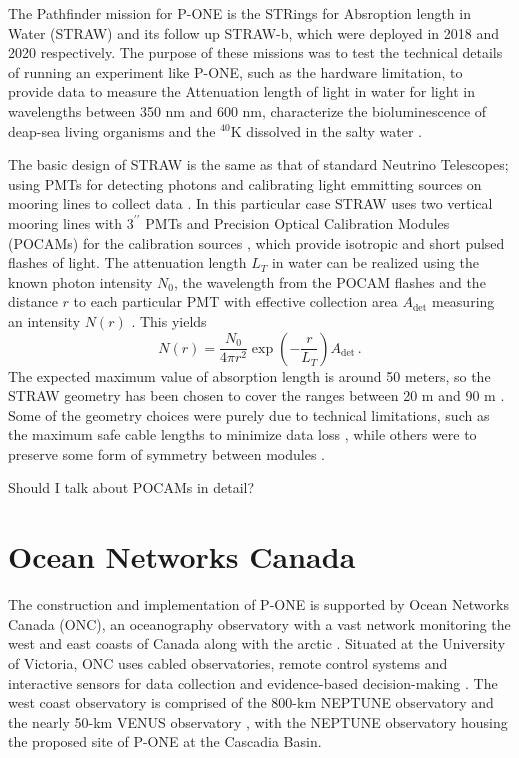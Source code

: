 The Pathfinder mission for P-ONE is the STRings for Absroption length in Water (STRAW) and its follow up STRAW-b, which were deployed in 2018 and 2020 respectively. The purpose of these missions was to test the technical details of running an experiment like P-ONE, such as the hardware limitation, to provide data to measure the Attenuation length of light in water for light in wavelengths between 350 nm and 600 nm, characterize the bioluminescence of deap-sea living organisms and the $^{40}$K dissolved in the salty water \cite{straw}.

The basic design of STRAW is the same as that of standard Neutrino Telescopes; using PMTs for detecting photons and calibrating light emmitting sources on mooring lines to collect data \cite{straw}. In this particular case STRAW uses two vertical mooring lines with $3^{\prime\prime}$ PMTs and Precision Optical Calibration Modules (POCAMs) for the calibration sources \cite{straw}, which provide isotropic and short pulsed flashes of light. The attenuation length $L_{T}$ in water can be realized using the known photon intensity $N_{0}$, the wavelength from the POCAM flashes and the distance $r$ to each particular PMT with effective collection area $A_{\text{det}}$ measuring an intensity $N(r)$ \cite{straw}. This yields
\begin{equation}
  N(r) = \frac{N_{0}}{4\pi r^{2}}\exp\left(-\frac{r}{L_{T}}\right)A_{\text{det}}\, .
\end{equation}
The expected maximum value of absorption length is around 50 meters, so the STRAW geometry has been chosen to cover the ranges between 20 m and 90 m \cite{straw}. Some of the geometry choices were purely due to technical limitations, such as the maximum safe cable lengths to minimize data loss \cite{straw}, while others were to preserve some form of symmetry between modules \cite{straw}.

Should I talk about POCAMs in detail? \cite{pocam}

\section{Ocean Networks Canada}

The construction and implementation of P-ONE is supported by Ocean Networks Canada (ONC), an oceanography observatory with a vast network monitoring the west and east coasts of Canada along with the arctic \cite{onc}. Situated at the University of Victoria, ONC uses cabled observatories, remote control systems and interactive sensors for data collection and evidence-based decision-making \cite{onc}. The west coast observatory is comprised of the 800-km NEPTUNE observatory and the nearly 50-km VENUS observatory \cite{onc}, with the NEPTUNE observatory housing the proposed site of P-ONE at the Cascadia Basin.

